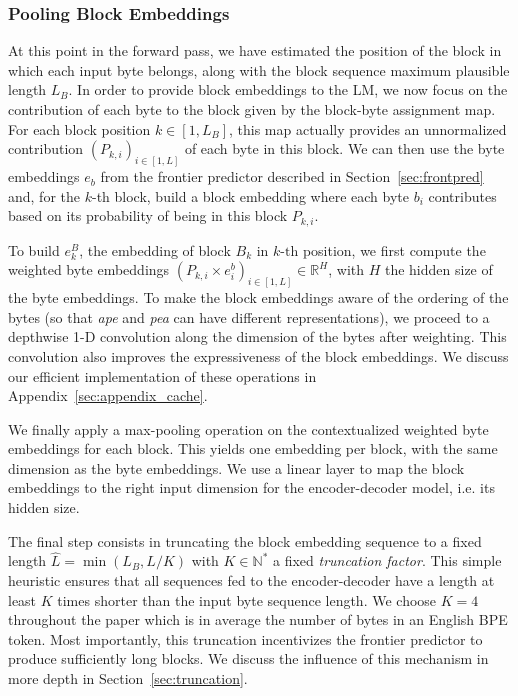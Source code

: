 \subsubsection{Pooling Block Embeddings}
\label{sec:pooling_block}
At this point in the forward pass, we have estimated the position of the block in which each input byte belongs, along with the block sequence maximum plausible length $L_B$.
%
In order to provide block embeddings to the LM, we now focus on the contribution of each byte to the block given by the block-byte assignment map. For each block position $k \in [1, L_B]$, this map actually provides an unnormalized contribution $(P_{k,i})_{i \in [1, L]}$ of each byte in this block. We can then use the byte embeddings $e_b$ from the frontier predictor described in Section~\ref{sec:frontpred} and, for the $k$-th block, build a block embedding where each byte $b_i$ contributes based on its probability of being in this block $P_{k,i}$.

To build $e^B_k$, the embedding of block $B_k$ in $k\text{-th}$ position, we first compute the weighted byte embeddings ${\left(P_{k,i} \times e^b_i\right)_{i \in [1, L]}}\in \mathbb{R}^H$, with $H$ the hidden size of the byte embeddings. To make the block embeddings aware of the ordering of the bytes (so that \textit{ape} and \textit{pea} can have different representations), we proceed to a depthwise 1-D convolution along the dimension of the bytes after weighting. This convolution also improves the expressiveness of the block embeddings. We discuss our efficient implementation of these operations in Appendix~\ref{sec:appendix_cache}.

We finally apply a max-pooling operation on the contextualized weighted byte embeddings for each block. This yields one embedding per block, with the same dimension as the byte embeddings. We use a linear layer to map the block embeddings to the right input dimension for the encoder-decoder model, i.e. its hidden size.


The final step consists in truncating the block embedding sequence to a fixed length $\hat{L} = \min(L_B, L / K)$ with $K\in \mathbb{N^*}$ a fixed \textit{truncation factor}. This simple heuristic ensures that all sequences fed to the encoder-decoder have a length at least $K$ times shorter than the input byte sequence length. We choose $K=4$ throughout the paper which is in average the number of bytes in an English BPE token. Most importantly, this truncation incentivizes the frontier predictor to produce sufficiently long blocks. We discuss the influence of this mechanism in more depth in Section~\ref{sec:truncation}.

